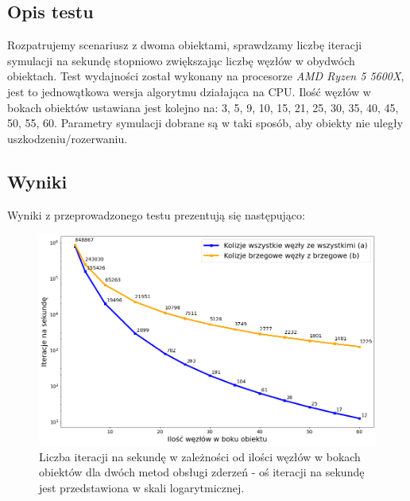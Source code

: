 \documentclass[12pt, letterpaper]{report}
\begin{document}
    \subsection{Opis testu}
    Rozpatrujemy scenariusz z dwoma obiektami, sprawdzamy liczbę iteracji symulacji na sekundę stopniowo
    zwiększając liczbę węzłów w obydwóch obiektach.
    Test wydajności został wykonany na procesorze \emph{AMD Ryzen 5 5600X}, 
    jest to jednowątkowa wersja algorytmu działająca na CPU.
    Ilość węzłów w bokach obiektów ustawiana jest kolejno na: 
    3, 5, 9, 10, 15, 21, 25, 30, 35, 40, 45, 50, 55, 60. Parametry symulacji dobrane są 
    w taki sposób, aby obiekty nie uległy uszkodzeniu/rozerwaniu.
    
    \subsection{Wyniki}
    Wyniki z przeprowadzonego testu prezentują się następująco:
    \begin{figure}[H]
        \centering
        \includegraphics[width=16cm]{performance_side_size}
        \caption{
            Liczba iteracji na sekundę w zależności od 
            ilości węzłów w bokach obiektów dla dwóch metod obsługi zderzeń -
            oś iteracji na sekundę jest przedstawiona w skali logarytmicznej.
        }
    \end{figure}
\end{document}

